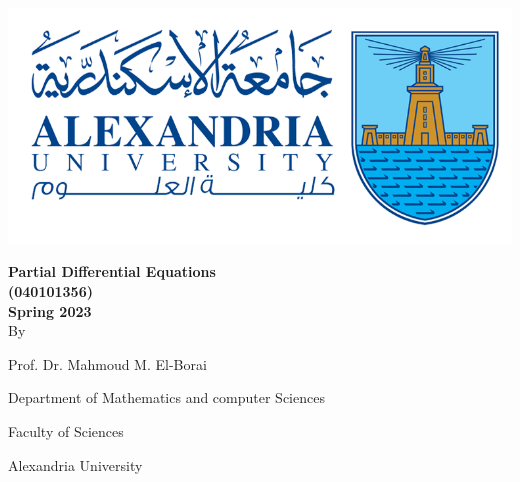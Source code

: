 \begingroup
\thispagestyle{empty}
\begin{center}
    \includegraphics[scale=.5]{collage logo.png}
    \vspace*{1.5cm}
    \par
    {\fontsize{20pt}{30pt}\selectfont
    \textbf{Partial Differential Equations\\(040101356)\\Spring 2023}
    \\
    \vspace*{.75cm}
    By
    \vspace*{.75cm}
    
    Prof. Dr. Mahmoud M. El-Borai
    
    Department of Mathematics and computer Sciences
    
    Faculty of Sciences
    
    Alexandria University
    }
\end{center}

\restoregeometry
\endgroup
\newpage
\thispagestyle{empty}
\tableofcontents

\newpage
\setcounter{page}{1}